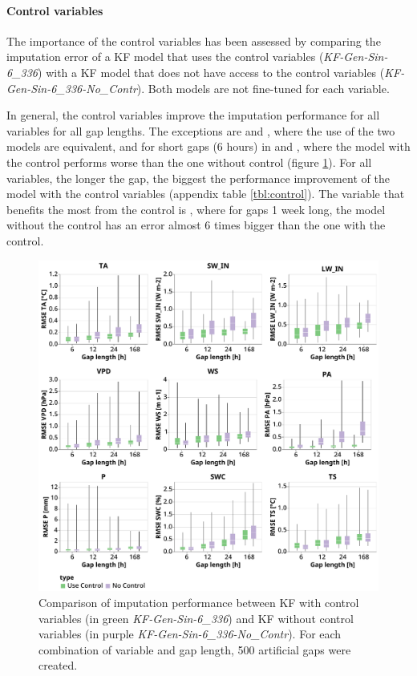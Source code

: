 \documentclass{article}
\newcommand{\imgwidth}{6in}
\begin{document}
\paragraph{Control variables}

The importance of the control variables has been assessed by comparing the imputation error of a KF model that uses the control variables (\textit{KF-Gen-Sin-6\_336}) with a KF model that does not have access to the control variables (\textit{KF-Gen-Sin-6\_336-No\_Contr}). Both models are not fine-tuned for each variable.

In general, the control variables improve the imputation performance for all variables for all gap lengths. The exceptions are  and , where the use of the two models are equivalent, and for short gaps (6 hours) in  and , where the model with the control performs worse than the one without control (figure \ref{fig:control}).
For all variables, the longer the gap, the biggest the performance improvement of the model with the control variables (appendix table \ref{tbl:control}).
The variable that benefits the most from the control is , where for gaps 1 week long, the model without the control has an error almost 6 times bigger than the one with the control.


\begin{figure}
\centerline{\includegraphics[width=\imgwidth]{use_control}}
\caption{Comparison of imputation performance between KF with control variables (in green \textit{KF-Gen-Sin-6\_336}) and KF without control variables (in purple \textit{KF-Gen-Sin-6\_336-No\_Contr}). For each combination of variable and gap length, 500 artificial gaps were created.}
\label{fig:control}
\end{figure}
\end{document}
